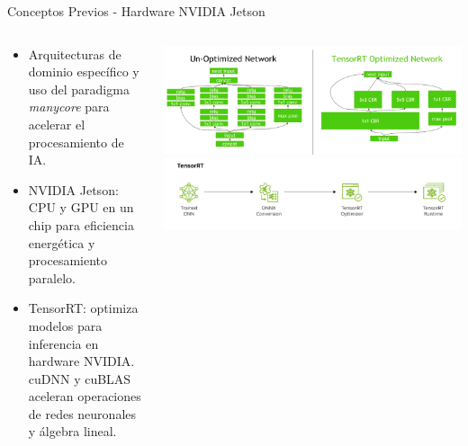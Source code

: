 \documentclass[spanish]{beamer}
\begin{document}
\begin{frame}{Conceptos Previos - Hardware NVIDIA Jetson}

    \begin{columns}
        \begin{column}{0.5\textwidth}
            \begin{itemize}
                \item Arquitecturas de dominio específico y uso del paradigma \textit{manycore} para acelerar el procesamiento de IA.
                \item NVIDIA Jetson: CPU y GPU en un chip para eficiencia energética y procesamiento paralelo.
                \item TensorRT: optimiza modelos para inferencia en hardware NVIDIA. cuDNN y cuBLAS aceleran operaciones de redes neuronales y álgebra lineal.          
            \end{itemize}
        \end{column}
        \begin{column}{0.5\textwidth}
            \includegraphics[width=1\textwidth]{images/conceptos_previos/TensorRT_optimizaciones.png}
            \includegraphics[width=1\textwidth]{images/conceptos_previos/TensorRT_pipeline.png}
        \end{column}
    \end{columns}
\end{frame}
\end{document}

